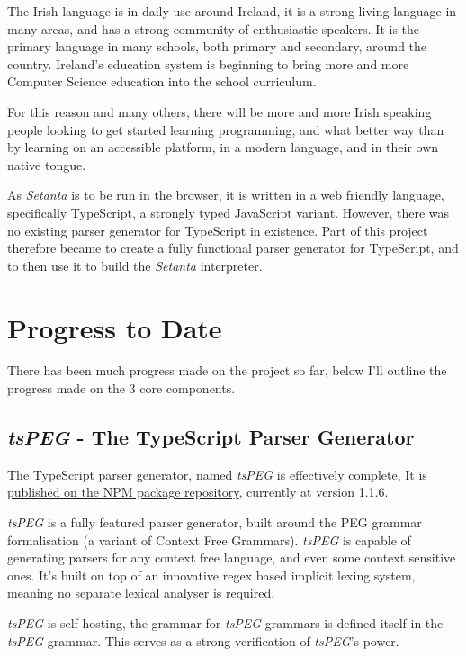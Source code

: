 \documentclass[11pt]{extarticle}
\newcommand{\Setanta}{\emph{Setanta}}
\newcommand{\tsPEG}{\emph{tsPEG}}
\begin{document}
        The Irish language is in daily use around Ireland, it is a strong living language in many areas, and has a strong community of enthusiastic speakers. It is the primary language in many schools, both primary and secondary, around the country. Ireland's education system is beginning to bring more and more Computer Science education into the school curriculum.
        
        For this reason and many others, there will be more and more Irish speaking people looking to get started learning programming, and what better way than by learning on an accessible platform, in a modern language, and in their own native tongue.

        As \Setanta{} is to be run in the browser, it is written in a web friendly language, specifically TypeScript, a strongly typed JavaScript variant. However, there was no existing parser generator for TypeScript in existence. Part of this project therefore became to create a fully functional parser generator for TypeScript, and to then use it to build the \Setanta{} interpreter.

    \section{Progress to Date}

        There has been much progress made on the project so far, below I'll outline the progress made on the 3 core components.

        \subsection{\tsPEG{} - The TypeScript Parser Generator}

            The TypeScript parser generator, named \tsPEG{} is effectively complete, It is \href{https://www.npmjs.com/package/tspeg}{published on the NPM package repository}, currently at version 1.1.6.

            \tsPEG{} is a fully featured parser generator, built around the PEG grammar formalisation (a variant of Context Free Grammars). \tsPEG{} is capable of generating parsers for any context free language, and even some context sensitive ones. It's built on top of an innovative regex based implicit lexing system, meaning no separate lexical analyser is required.

            \tsPEG{} is self-hosting, the grammar for \tsPEG{} grammars is defined itself in the \tsPEG{} grammar. This serves as a strong verification of \tsPEG{}'s power.
\end{document}
